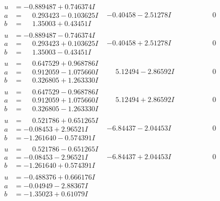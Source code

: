 \documentclass[1p]{elsarticle_modified}
\theoremstyle{definition}
\begin{document}
$$\begin{array}{c|c|c}
 \hline 
\begin{aligned}
u &= -0.889487 + 0.746374 I \\
a &= \phantom{-}0.293423 - 0.103625 I \\
b &= \phantom{-}1.35003 + 0.43451 I\end{aligned}
 & -0.40458 - 2.51278 I & \phantom{-0.000000 } 0 \\ \hline\begin{aligned}
u &= -0.889487 - 0.746374 I \\
a &= \phantom{-}0.293423 + 0.103625 I \\
b &= \phantom{-}1.35003 - 0.43451 I\end{aligned}
 & -0.40458 + 2.51278 I & \phantom{-0.000000 } 0 \\ \hline\begin{aligned}
u &= \phantom{-}0.647529 + 0.968786 I \\
a &= \phantom{-}0.912059 - 1.075660 I \\
b &= \phantom{-}0.326805 + 1.263330 I\end{aligned}
 & \phantom{-}5.12494 - 2.86592 I & \phantom{-0.000000 } 0 \\ \hline\begin{aligned}
u &= \phantom{-}0.647529 - 0.968786 I \\
a &= \phantom{-}0.912059 + 1.075660 I \\
b &= \phantom{-}0.326805 - 1.263330 I\end{aligned}
 & \phantom{-}5.12494 + 2.86592 I & \phantom{-0.000000 } 0 \\ \hline\begin{aligned}
u &= \phantom{-}0.521786 + 0.651265 I \\
a &= -0.08453 + 2.96521 I \\
b &= -1.261640 - 0.574391 I\end{aligned}
 & -6.84437 - 2.04453 I & \phantom{-0.000000 } 0 \\ \hline\begin{aligned}
u &= \phantom{-}0.521786 - 0.651265 I \\
a &= -0.08453 - 2.96521 I \\
b &= -1.261640 + 0.574391 I\end{aligned}
 & -6.84437 + 2.04453 I & \phantom{-0.000000 } 0 \\ \hline\begin{aligned}
u &= -0.488376 + 0.666176 I \\
a &= -0.04949 - 2.88367 I \\
b &= -1.35023 + 0.61079 I\end{aligned}

\end{array}$$
\end{document}
